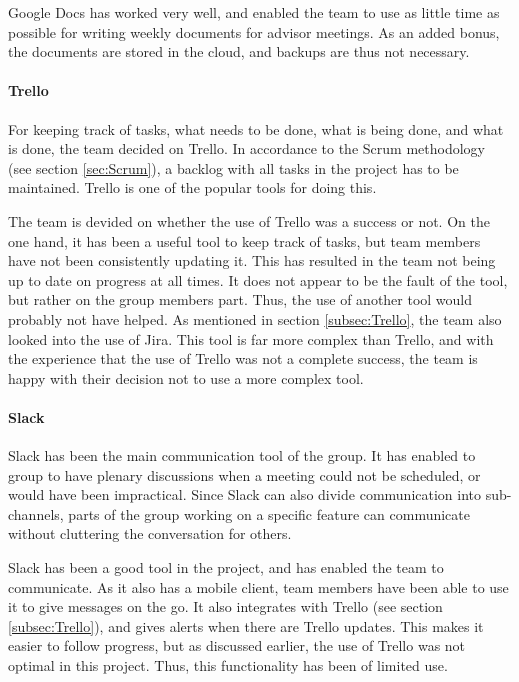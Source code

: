 \documentclass[11pt,a4paper,titlepage,oneside]{report}
\begin{document}
Google Docs has worked very well, and enabled the team to use as little time as possible for writing weekly documents for advisor meetings. As an added bonus, the documents are stored in the cloud, and backups are thus not necessary. 

\paragraph{Trello}
For keeping track of tasks, what needs to be done, what is being done, and what is done, the team decided on Trello. In accordance to the Scrum methodology (see section \ref{sec:Scrum}), a backlog with all tasks in the project has to be maintained. Trello is one of the popular tools for doing this. 

The team is devided on whether the use of Trello was a success or not. On the one hand, it has been a useful tool to keep track of tasks, but team members have not been consistently updating it. This has resulted in the team not being up to date on progress at all times. It does not appear to be the fault of the tool, but rather on the group members part. Thus, the use of another tool would probably not have helped. As mentioned in section \ref{subsec:Trello}, the team also looked into the use of Jira. This tool is far more complex than Trello, and with the experience that the use of Trello was not a complete success, the team is happy with their decision not to use a more complex tool. 

\paragraph{Slack}
Slack has been the main communication tool of the group. It has enabled to group to have plenary discussions when a meeting could not be scheduled, or would have been impractical. Since Slack can also divide communication into sub-channels, parts of the group working on a specific feature can communicate without cluttering the conversation for others.

Slack has been a good tool in the project, and has enabled the team to communicate. As it also has a mobile client, team members have been able to use it to give messages on the go. It also integrates with Trello (see section \ref{subsec:Trello}), and gives alerts when there are Trello updates. This makes it easier to follow progress, but as discussed earlier, the use of Trello was not optimal in this project. Thus, this functionality has been of limited use. 
\end{document}
